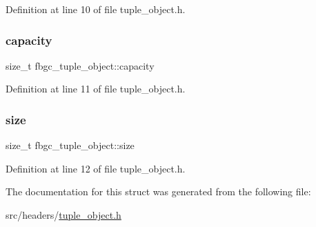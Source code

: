 Definition at line 10 of file tuple\+\_\+object.\+h.

\mbox{\label{structfbgc__tuple__object_a216ec53e33e224f0c2aa1b0e0b7ed714}} 
\subsubsection{\texorpdfstring{capacity}{capacity}}
{\footnotesize\ttfamily size\+\_\+t fbgc\+\_\+tuple\+\_\+object\+::capacity}



Definition at line 11 of file tuple\+\_\+object.\+h.

\mbox{\label{structfbgc__tuple__object_af01be64362503bcfe1d7e9c3fc779723}} 
\subsubsection{\texorpdfstring{size}{size}}
{\footnotesize\ttfamily size\+\_\+t fbgc\+\_\+tuple\+\_\+object\+::size}



Definition at line 12 of file tuple\+\_\+object.\+h.



The documentation for this struct was generated from the following file\+:\begin{DoxyCompactItemize}
\item 
src/headers/\hyperlink{tuple__object_8h}{tuple\+\_\+object.\+h}\end{DoxyCompactItemize}
